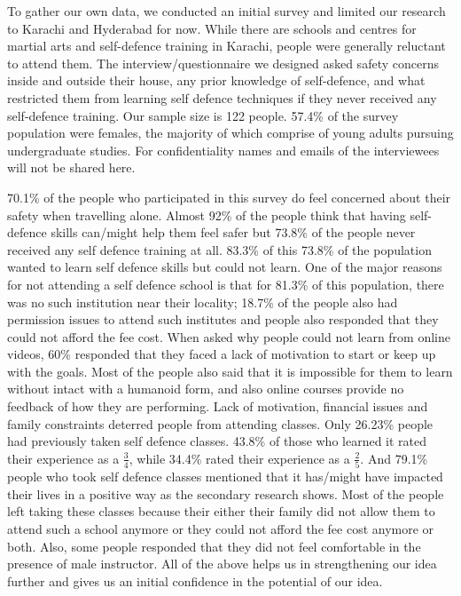 To gather our own data, we conducted an initial survey and limited our research to Karachi and Hyderabad for now. While there are schools and centres for martial arts and self-defence training in Karachi, people were generally reluctant to attend them. The interview/questionnaire we designed asked safety concerns inside and outside their house, any prior knowledge of self-defence, and what restricted them from learning self defence techniques if they never received any self-defence training. Our sample size is 122 people. 57.4\% of the survey population were females, the majority of which comprise of young adults pursuing undergraduate studies. For confidentiality names and emails of the interviewees will not be shared here.

70.1\% of the people who participated in this survey do feel concerned about their safety when travelling alone.  Almost 92\% of the people think that having self-defence skills can/might help them feel safer but 73.8\% of the people never received any self defence training at all. 83.3\% of this 73.8\% of the population wanted to learn self defence skills but could not learn. One of the major reasons for not attending a self defence school is that for 81.3\% of this population, there was no such institution near their locality; 18.7\%  of the people also had permission issues to attend such institutes and people also responded that they could not afford the fee cost. When asked why people could not learn from online videos, 60\% responded that they faced a lack of motivation to start or keep up with the goals. Most of the people also said that it is impossible for them to learn without intact with a humanoid form, and also online courses provide no feedback of how they are performing. Lack of motivation, financial issues and family constraints deterred people from attending classes. Only 26.23\% people had previously taken self defence classes. 43.8\% of those who learned it rated their experience as a \(\frac{3}{4}\), while 34.4\% rated their experience as a \(\frac{2}{5}\). And 79.1\% people who took self defence classes mentioned that it has/might have impacted their lives in a positive way as the secondary research shows. Most of the people left taking these classes because their either their family did not allow them to attend such a school anymore or they could not afford the fee cost anymore or both. Also, some people responded that they did not feel comfortable in the presence of male instructor.  All of the above helps us in strengthening our idea further and gives us an initial confidence in the potential of our idea. 
